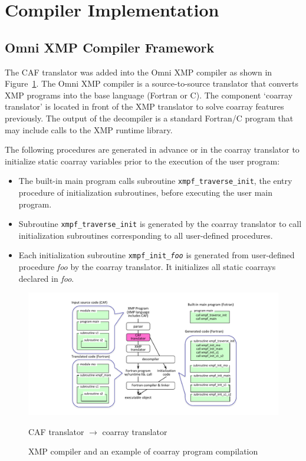 \section{Compiler Implementation}\label{sec:compiler}


\subsection{Omni XMP Compiler Framework}

The CAF translator was added into the Omni XMP compiler as shown in Figure~\ref{fig:translator}.
The Omni XMP compiler is a source-to-source translator that converts XMP programs 
into the base language (Fortran or C).  The component `coarray translator' is 
located in front of the XMP translator to solve coarray features previously. 
The output of the decompiler is a standard Fortran/C program that may include 
calls to the XMP runtime library.

The following procedures are generated in advance or in the coarray translator
to initialize static coarray variables prior to the execution of the user program:
\begin{itemize}
\item
The built-in main program calls subroutine {\tt xmpf\_traverse\_init},
the entry procedure of initialization subroutines, before executing the
user main program.
\item
Subroutine {\tt xmpf\_traverse\_init} is generated by the coarray translator 
to call initialization subroutines corresponding to all user-defined procedures.
\item
Each initialization subroutine {\tt xmpf\_init\_{\it foo}} is generated from 
user-defined procedure {\it foo} by the coarray translator. 
It initializes all static coarrays declared in {\it foo}.
\end{itemize}

\begin{figure}[tbh]
 \begin{center}
  \includegraphics[trim=30mm 0mm 20mm 7mm, scale=1.0]{figs/translator-tmp.pdf}
  \caption{XMP compiler and an example of coarray program compilation}
  \label{fig:translator}
  CAF translator $\rightarrow$ coarray translator
 \end{center}
\end{figure}



